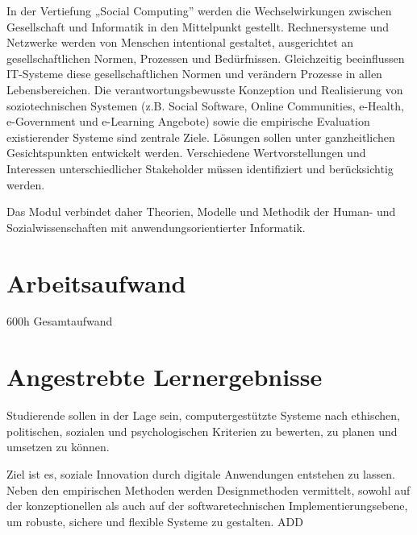 In der Vertiefung „Social Computing'' werden die Wechselwirkungen
zwischen Gesellschaft und Informatik in den Mittelpunkt gestellt.
Rechnersysteme und Netzwerke werden von Menschen intentional gestaltet,
ausgerichtet an gesellschaftlichen Normen, Prozessen und Bedürfnissen.
Gleichzeitig beeinflussen IT-Systeme diese gesellschaftlichen Normen und
verändern Prozesse in allen Lebensbereichen. Die verantwortungsbewusste
Konzeption und Realisierung von soziotechnischen Systemen (z.B. Social
Software, Online Communities, e-Health, e-Government und e-Learning
Angebote) sowie die empirische Evaluation existierender Systeme sind
zentrale Ziele. Lösungen sollen unter ganzheitlichen Gesichtspunkten
entwickelt werden. Verschiedene Wertvorstellungen und Interessen
unterschiedlicher Stakeholder müssen identifiziert und berücksichtig
werden.

Das Modul verbindet daher Theorien, Modelle und Methodik der Human- und
Sozialwissenschaften mit anwendungsorientierter Informatik.

\hypertarget{arbeitsaufwandpathlabelmi-2017modulbeschreibungen-bachelorba_vertiefung_socialcomputing}{%
\section*{Arbeitsaufwand\label{/mi-2017/modulbeschreibungen-bachelor/BA_Vertiefung_SocialComputing}}\label{arbeitsaufwandpathlabelmi-2017modulbeschreibungen-bachelorba_vertiefung_socialcomputing}}

600h Gesamtaufwand

\hypertarget{angestrebte-lernergebnissepathlabelmi-2017modulbeschreibungen-bachelorba_vertiefung_socialcomputing}{%
\section*{Angestrebte
Lernergebnisse\label{/mi-2017/modulbeschreibungen-bachelor/BA_Vertiefung_SocialComputing}}\label{angestrebte-lernergebnissepathlabelmi-2017modulbeschreibungen-bachelorba_vertiefung_socialcomputing}}

Studierende sollen in der Lage sein, computergestützte Systeme nach
ethischen, politischen, sozialen und psychologischen Kriterien zu
bewerten, zu planen und umsetzen zu können.

Ziel ist es, soziale Innovation durch digitale Anwendungen entstehen zu
lassen. Neben den empirischen Methoden werden Designmethoden vermittelt,
sowohl auf der konzeptionellen als auch auf der softwaretechnischen
Implementierungsebene, um robuste, sichere und flexible Systeme zu
gestalten. ADD

